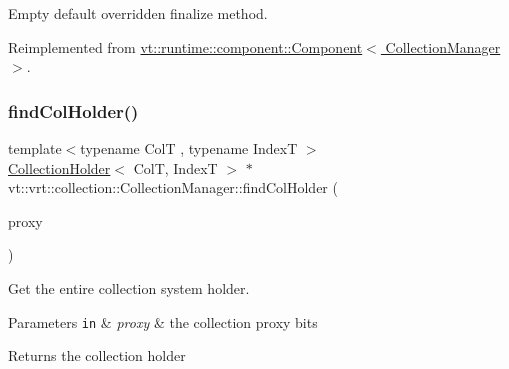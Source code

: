 Empty default overridden finalize method. 



Reimplemented from \hyperlink{structvt_1_1runtime_1_1component_1_1_component_a098e362de01af6054e5491fba671a959}{vt\+::runtime\+::component\+::\+Component$<$ Collection\+Manager $>$}.

\mbox{\label{structvt_1_1vrt_1_1collection_1_1_collection_manager_ac3fe0114969d91628d612eccc2166159}} 
\subsubsection{\texorpdfstring{find\+Col\+Holder()}{findColHolder()}}
{\footnotesize\ttfamily template$<$typename ColT , typename IndexT $>$ \\
\hyperlink{structvt_1_1vrt_1_1collection_1_1_collection_holder}{Collection\+Holder}$<$ ColT, IndexT $>$ $\ast$ vt\+::vrt\+::collection\+::\+Collection\+Manager\+::find\+Col\+Holder (\begin{DoxyParamCaption}\item[{\hyperlink{namespacevt_a1b417dd5d684f045bb58a0ede70045ac}{Virtual\+Proxy\+Type} const \&}]{proxy }\end{DoxyParamCaption})\hspace{0.3cm}{\ttfamily [private]}}



Get the entire collection system holder. 


\begin{DoxyParams}[1]{Parameters}
\mbox{\tt in}  & {\em proxy} & the collection proxy bits\\
\hline
\end{DoxyParams}
\begin{DoxyReturn}{Returns}
the collection holder 
\end{DoxyReturn}
\mbox{\label{structvt_1_1vrt_1_1collection_1_1_collection_manager_a06ff4b51fe7e15c8c4b7768cf7a1ad03}} 
